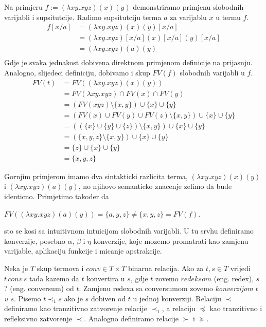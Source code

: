 \begin{primjer}
  Na primjeru $f := (\lambda x y . x y z) (x) (y)$ demonstriramo primjenu slobodnih varijabli i supsitutcije.
  Radimo supsitutciju terma $a$ za varijablu $x$ u termu $f$.
  \begin{align*}
    f[x/a]  &= (\lambda x y . x y z) (x) (y) [x/a] \\
            &= (\lambda x y . x y z)[x/a] (x)[x/a] (y) [x/a] \\ 
            &= (\lambda x y . x y z ) (a) (y) \\ 
  \end{align*}
  Gdje je svaka jednakost dobivena direktnom primjenom definicije na prijasnju. Analogno, slijedeci definiciju, dobivamo i skup $FV(f)$ slobodnih varijabli u $f$.
  \begin{align*}
    FV(t) &= FV((\lambda x y . x y z) (x) (y)) \\
          &= FV(\lambda x y . x y z) \cap FV(x) \cap FV(y) \\
          &= (FV(x y z) \setminus \{x, y\}) \cup \{x\} \cup \{y\} \\
          &= (FV(x) \cup FV(y) \cup FV(z) \setminus \{x, y\}) \cup \{x\} \cup \{y\} \\
          &= ((\{x\} \cup \{y\} \cup \{z\}) \setminus \{x, y\}) \cup \{x\} \cup \{y\} \\
          &= (\{x, y, z\}\setminus \{x, y\}) \cup \{x\} \cup \{y\} \\
          &= \{z\} \cup \{x\} \cup \{y\} \\
          &= \{x, y, z\}
  \end{align*}
\end{primjer}

Gornjim primjerom imamo dva sintakticki razlicita terma, $ (\lambda x y . x y z) (x) (y)$ i  $(\lambda x y . x y z) (a) (y)$, no njihovo semanticko znacenje zelimo da bude identicno. Primjetimo takoder da
\begin{center}
$FV((\lambda x y . x y z) (a) (y)) = \{a, y, z\} \neq \{x, y, z\} = FV(f)$.
\end{center}

sto se kosi sa intuitivnom intuicijom slobodnih varijabli. U tu srvhu definiramo konverzije, posebno $\alpha$, $\beta$ i $\eta$ konverzije, koje mozemo promatrati kao zamjenu varijable, aplikaciju funkcije i micanje apstrakcije. 

\begin{definition}[Konverzija]
  Neka je $T$ skup termova i $conv \in T \times T$ binarna relacija. Ako za $t, s \in T$ vrijedi $t\, conv\, s$ tada kazemo da $t$ konvertira u $s$, gdje $t$ zovemo $redeksom$ (eng. redex), $s$  ? (eng. conversum) od $t$. Zamjenu redexa sa conversumom zovemo \emph{konverzijom $t$ u $s$}. Pisemo $t \prec_1 s$ ako je $s$ dobiven od $t$ u jednoj konverziji. Relaciju $\prec$ definiramo kao tranzitivno zatvorenje relacije $\prec_1$, a relaciju $\preceq$ kao tranzitivno i refleksivno zatvorenje $\prec$. Analogno definiramo relacije $\succ$ i $\succeq$.
\end{definition}


